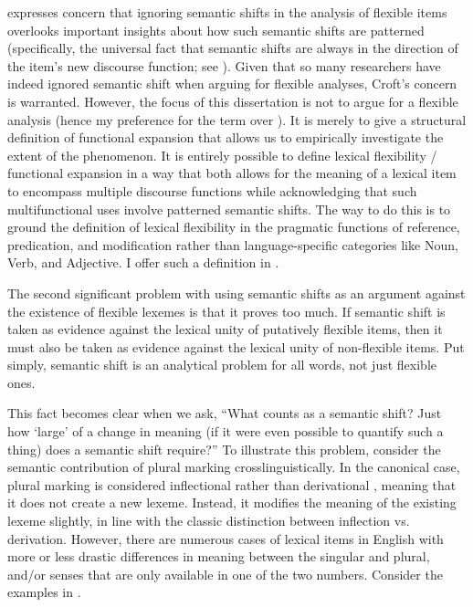\textcite[73]{Croft2001b} expresses concern that ignoring semantic shifts in the analysis of flexible items overlooks important insights about how such semantic shifts are patterned (specifically, the universal fact that semantic shifts are always in the direction of the item's new discourse function; see ). Given that so many researchers have indeed ignored semantic shift when arguing for flexible analyses, Croft's concern is warranted. However, the focus of this dissertation is not to argue for a flexible analysis (hence my preference for the term  over ). It is merely to give a structural definition of functional expansion that allows us to empirically investigate the extent of the phenomenon. It is entirely possible to define lexical flexibility / functional expansion in a way that both allows for the meaning of a lexical item to encompass multiple discourse functions while acknowledging that such multifunctional uses involve patterned semantic shifts. The way to do this is to ground the definition of lexical flexibility in the pragmatic functions of reference, predication, and modification rather than language-specific categories like Noun, Verb, and Adjective. I offer such a definition in .

The second significant problem with using semantic shifts as an argument against the existence of flexible lexemes is that it proves too much. If semantic shift is taken as evidence against the lexical unity of putatively flexible items, then it must also be taken as evidence against the lexical unity of non-flexible items. Put simply, semantic shift is an analytical problem for all words, not just flexible ones.

This fact becomes clear when we ask, \enquote{What counts as a semantic shift? Just how \enquote{large} of a change in meaning (if it were even possible to quantify such a thing) does a semantic shift require?} To illustrate this problem, consider the semantic contribution of plural marking crosslinguistically. In the canonical case, plural marking is considered inflectional rather than derivational \parencite[2]{Corbett2000}, meaning that it does not create a new lexeme. Instead, it modifies the meaning of the existing lexeme slightly, in line with the classic distinction between inflection vs. derivation. However, there are numerous cases of lexical items in English with more or less drastic differences in meaning between the singular and plural, and/or senses that are only available in one of the two numbers. Consider the examples in .

